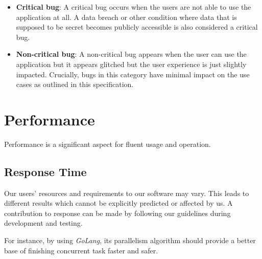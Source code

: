 \documentclass[a4paper,12pt,chapterprefix=false,bibliography=totoc,listof=totoc,]{scrreprt}
\begin{document}
\begin{itemize}
    \item \textbf{Critical bug}: A critical bug occurs when the users are not able to use the application at all. A data breach or other condition where data that is supposed to be secret becomes publicly accessible is also considered a critical bug.
    \item \textbf{Non-critical bug}: A non-critical bug appears when the user can use the application but it appears glitched but the user experience is just slightly impacted. Crucially, bugs in this category have minimal impact on the use cases as outlined in this specification.
\end{itemize}

\section{Performance}
Performance is a significant aspect for fluent usage and operation.

\subsection{Response Time}
Our users' resources and requirements to our software may vary. This leads to different results which cannot be explicitly predicted or affected by us. A contribution to response can be made by following our guidelines during development and testing.

For instance, by using \emph{GoLang}, its parallelism algorithm should provide a better base of finishing concurrent task faster and safer.
\end{document}
